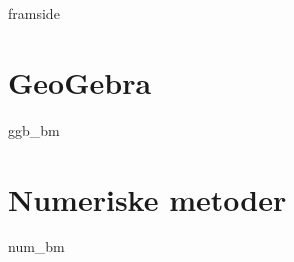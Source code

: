 





\addto\captionsenglish{\renewcommand{\contentsname}{Innhold}}


	
	{framside}
	
	{\footnotesize \tableofcontents}
	\newpage
	
	\chapter{GeoGebra}
	\newpage
	{ggb_bm}
	
	\chapter{Numeriske metoder}
	\newpage
	{num_bm}
	
	
	
	
	


	
	


